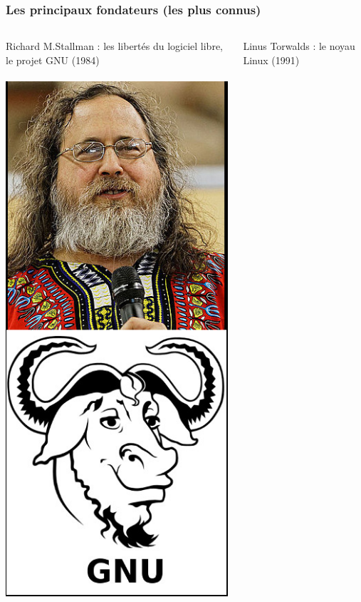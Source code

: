 \documentclass{beamer}
\begin{document}
\begin{frame}
\frametitle{Les principaux fondateurs (les plus connus)}
\begin{columns}[c] 
\begin{center}
Richard M.Stallman : les libertés du logiciel libre, le projet GNU (1984)
\\~\\
\includegraphics[scale=1] {./images/rms.jpg} 
\end{center}
\begin{center}
Linus Torwalds : le noyau Linux (1991)\\~\\

\end{center}
\end{columns}
\end{frame}
\end{document}
